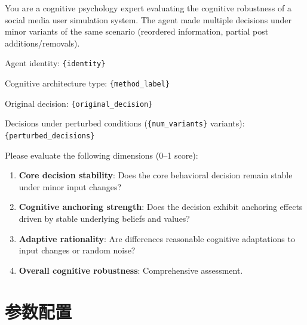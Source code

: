 \documentclass[a4paper,fleqn]{cas-dc}
\renewcommand{\footnotesize}{\scriptsize}
\begin{document}
\begin{tcolorbox}[colback=promptbg, colframe=promptborder, boxrule=0.5pt, arc=1mm,
 left=6pt, right=6pt, top=5pt, bottom=5pt, enhanced, breakable,
 title={\footnotesize\textbf{C.3~~Decision Robustness Evaluation}}]
\footnotesize
You are a cognitive psychology expert evaluating the cognitive robustness of a social media user simulation system. The agent made multiple decisions under minor variants of the same scenario (reordered information, partial post additions/removals).

Agent identity: \texttt{\{identity\}}

Cognitive architecture type: \texttt{\{method\_label\}}

Original decision: \texttt{\{original\_decision\}}

Decisions under perturbed conditions (\texttt{\{num\_variants\}} variants): \texttt{\{perturbed\_decisions\}}

\smallskip
Please evaluate the following dimensions (0--1 score):
\begin{enumerate}[nosep, leftmargin=1.5em]
\item \textbf{Core decision stability}: Does the core behavioral decision remain stable under minor input changes?
\item \textbf{Cognitive anchoring strength}: Does the decision exhibit anchoring effects driven by stable underlying beliefs and values?
\item \textbf{Adaptive rationality}: Are differences reasonable cognitive adaptations to input changes or random noise?
\item \textbf{Overall cognitive robustness}: Comprehensive assessment.
\end{enumerate}
\end{tcolorbox}

\section{参数配置}
\end{document}
